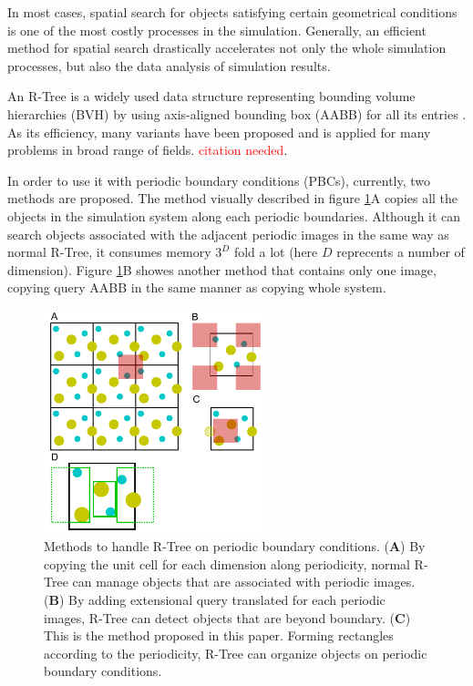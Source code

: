 \documentclass[10pt,letterpaper,twocolumn]{article}
\begin{document}
In most cases, spatial search for objects satisfying certain geometrical
conditions is one of the most costly processes in the simulation. Generally, an
efficient method for spatial search drastically accelerates not only the whole
simulation processes, but also the data analysis of simulation results.

An R-Tree is a widely used data structure representing bounding volume
hierarchies (BVH) by using axis-aligned bounding box (AABB) for all its entries
\cite{Guttman1984}. As its efficiency, many variants have been proposed and is
applied for many problems in broad range of fields.
\textcolor{red}{citation needed}.

In order to use it with periodic boundary conditions (PBCs), currently,
two methods are proposed\cite{CoSTR-R-tree2016}. The method visually described in
figure \ref{fig1}A copies all the objects in the simulation system
along each periodic boundaries. Although it can search objects associated with
the adjacent periodic images in the same way as normal R-Tree, it consumes
memory $3^D$ fold a lot (here $D$ reprecents a number of dimension). Figure
\ref{fig1}B showes another method that contains only one image,
copying query AABB in the same manner as copying whole system.

\begin{figure}[hbt]
    \includegraphics[width=6.5cm, bb=0 0 567 567]{fig1.eps}
    \caption{Methods to handle R-Tree on periodic boundary conditions. (\textbf{A})
    By copying the unit cell for each dimension along periodicity, normal R-Tree
    can manage objects that are associated with periodic images. (\textbf{B}) By
    adding extensional query translated for each periodic images, R-Tree can
    detect objects that are beyond boundary. (\textbf{C}) This is the method proposed
    in this paper. Forming rectangles according to the periodicity, R-Tree can
    organize objects on periodic boundary conditions.}
    \label{fig1}
\end{figure}
\end{document}
